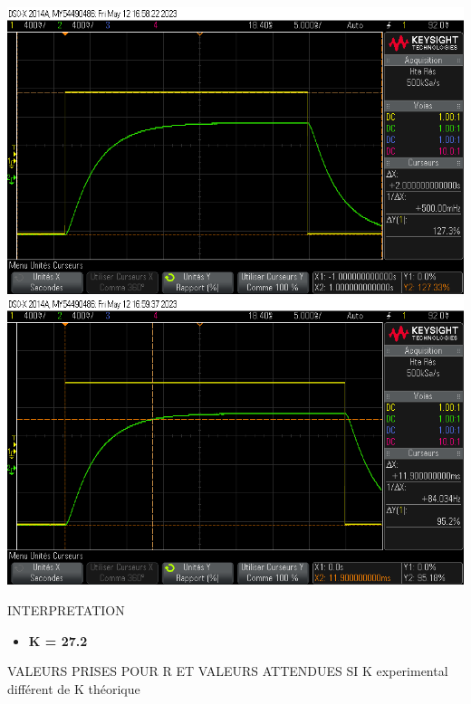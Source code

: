 \documentclass[12pt]{article}
\begin{document}
\begin{center}
    \includegraphics[width = 18 cm]{TP3/Syst_1/P/err_stat_K2_2_syst1.png}
    \includegraphics[width = 18 cm]{TP3/Syst_1/P/tr5prct_syst1_K2_2.png}
\end{center}
\large INTERPRETATION
\begin{itemize}
\item \bf \large K = 27.2
\end{itemize}
\large VALEURS PRISES POUR R ET VALEURS ATTENDUES SI K experimental différent de K théorique
\end{document}
